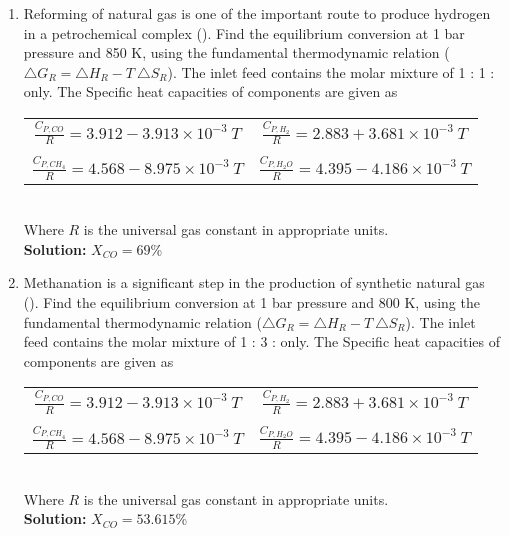 \documentclass[a4paper,10pt]{article}
\begin{document}
\begin{enumerate}
    \item Reforming of natural gas is one of the important route to produce hydrogen in a petrochemical complex (). Find the equilibrium conversion at 1 bar pressure and 850 K, using the fundamental thermodynamic relation ($\triangle G_R=\triangle H_R-T\ \triangle S_R$). The inlet feed contains the molar mixture of 1 : 1  :  only. The Specific heat capacities of components are given as\\[2 mm]
    \begin{tabular}{cc}
    $\frac{C_{P,CO}}{R}=3.912- 3.913\times10^{-3}\ T$ & $\frac{C_{P,H_2}}{R}=2.883 + 3.681\times10^{-3}\ T$ \\
    &\\
    $\frac{C_{P,CH_4}}{R}=4.568-8.975\times10^{-3}\ T$ & $\frac{C_{P,H_2O}}{R}=4.395-4.186\times10^{-3}\ T$
    \end{tabular}
    \\[2 mm] Where $R$ is the universal gas constant in appropriate units.\\[3 mm]\textbf{Solution: }$X_{CO}=69$\%
    
    \item {} Methanation is a significant step in the production of synthetic natural gas (). Find the equilibrium conversion at 1 bar pressure and 800 K, using the fundamental thermodynamic relation ($\triangle G_R=\triangle H_R-T\ \triangle S_R$). The inlet feed contains the molar mixture of 1 : 3  :  only. The Specific heat capacities of components are given as\\[2 mm]
    \begin{tabular}{cc}
    $\frac{C_{P,CO}}{R}=3.912- 3.913\times10^{-3}\ T$ & $\frac{C_{P,H_2}}{R}=2.883 + 3.681\times10^{-3}\ T$ \\
    &\\
    $\frac{C_{P,CH_4}}{R}=4.568-8.975\times10^{-3}\ T$ & $\frac{C_{P,H_2O}}{R}=4.395-4.186\times10^{-3}\ T$
    \end{tabular}
    \\[2 mm] Where $R$ is the universal gas constant in appropriate units.\\[3 mm]\textbf{Solution: }$X_{CO}=53.615$\%
    

\end{enumerate}
\end{document}
